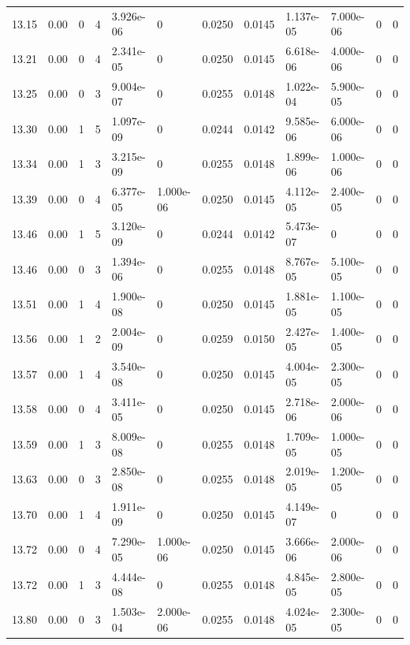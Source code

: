 \documentclass[preview]{standalone}
\begin{document}
{{{{{{{{{\begin{tabular}{L{1.2cm}C{1.2cm} C{0.3cm}C{0.5cm} C{1.4cm}C{1.4cm} C{1.4cm}C{1.4cm} C{1.6cm}C{1.6cm} C{1.6cm}C{1.6cm}}
  13.15  &  0.00  & 0     &  4 &  3.926e-06  & 0  &  0.0250&   0.0145& 1.137e-05 & 7.000e-06   &  0 & 0  \\ 
  13.21  &  0.00  & 0     &  4 &  2.341e-05  & 0  &  0.0250&   0.0145& 6.618e-06 & 4.000e-06   &  0 & 0  \\ 
  13.25  &  0.00  & 0     &  3 &  9.004e-07  & 0  &  0.0255&   0.0148& 1.022e-04 & 5.900e-05   &  0 & 0  \\ 
  13.30  &  0.00  & 1     &  5 &  1.097e-09  & 0  &  0.0244&   0.0142& 9.585e-06 & 6.000e-06   &  0 & 0  \\ 
  13.34  &  0.00  & 1     &  3 &  3.215e-09  & 0  &  0.0255&   0.0148& 1.899e-06 & 1.000e-06   &  0 & 0  \\ 
  13.39  &  0.00  & 0     &  4 &  6.377e-05  & 1.000e-06  &  0.0250&   0.0145& 4.112e-05 & 2.400e-05   &  0 & 0  \\ 
  13.46  &  0.00  & 1     &  5 &  3.120e-09  & 0  &  0.0244&   0.0142& 5.473e-07 & 0   &  0 & 0  \\ 
  13.46  &  0.00  & 0     &  3 &  1.394e-06  & 0  &  0.0255&   0.0148& 8.767e-05 & 5.100e-05   &  0 & 0  \\ 
  13.51  &  0.00  & 1     &  4 &  1.900e-08  & 0  &  0.0250&   0.0145& 1.881e-05 & 1.100e-05   &  0 & 0  \\ 
  13.56  &  0.00  & 1     &  2 &  2.004e-09  & 0  &  0.0259&   0.0150& 2.427e-05 & 1.400e-05   &  0 & 0  \\ 
  13.57  &  0.00  & 1     &  4 &  3.540e-08  & 0  &  0.0250&   0.0145& 4.004e-05 & 2.300e-05   &  0 & 0  \\ 
  13.58  &  0.00  & 0     &  4 &  3.411e-05  & 0  &  0.0250&   0.0145& 2.718e-06 & 2.000e-06   &  0 & 0  \\ 
  13.59  &  0.00  & 1     &  3 &  8.009e-08  & 0  &  0.0255&   0.0148& 1.709e-05 & 1.000e-05   &  0 & 0  \\ 
  13.63  &  0.00  & 0     &  3 &  2.850e-08  & 0  &  0.0255&   0.0148& 2.019e-05 & 1.200e-05   &  0 & 0  \\ 
  13.70  &  0.00  & 1     &  4 &  1.911e-09  & 0  &  0.0250&   0.0145& 4.149e-07 & 0   &  0 & 0  \\ 
  13.72  &  0.00  & 0     &  4 &  7.290e-05  & 1.000e-06  &  0.0250&   0.0145& 3.666e-06 & 2.000e-06   &  0 & 0  \\ 
  13.72  &  0.00  & 1     &  3 &  4.444e-08  & 0  &  0.0255&   0.0148& 4.845e-05 & 2.800e-05   &  0 & 0  \\ 
  13.80  &  0.00  & 0     &  3 &  1.503e-04  & 2.000e-06  &  0.0255&   0.0148& 4.024e-05 & 2.300e-05   &  0 & 0  \\ 

\end{tabular}}}}}}}}}}
\end{document}
